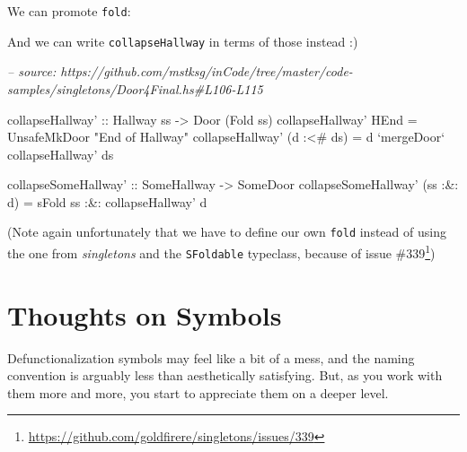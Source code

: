 \documentclass[]{article}
\newenvironment{Shaded}{}{}
\newcommand{\CommentTok}[1]{\textcolor[rgb]{0.38,0.63,0.69}{\textit{#1}}}
\newcommand{\DataTypeTok}[1]{\textcolor[rgb]{0.56,0.13,0.00}{#1}}
\newcommand{\FunctionTok}[1]{\textcolor[rgb]{0.02,0.16,0.49}{#1}}
\newcommand{\NormalTok}[1]{#1}
\newcommand{\OtherTok}[1]{\textcolor[rgb]{0.00,0.44,0.13}{#1}}
\newcommand{\StringTok}[1]{\textcolor[rgb]{0.25,0.44,0.63}{#1}}
\renewcommand{\href}[2]{#2\footnote{\url{#1}}}
\begin{document}
We can promote \texttt{fold}:

\begin{Shaded}
\end{Shaded}

And we can write \texttt{collapseHallway} in terms of those instead :)

\begin{Shaded}
\begin{Highlighting}[]
\CommentTok{-- source: https://github.com/mstksg/inCode/tree/master/code-samples/singletons/Door4Final.hs#L106-L115}

\NormalTok{collapseHallway'}
\OtherTok{    ::} \DataTypeTok{Hallway}\NormalTok{ ss}
    \OtherTok{->} \DataTypeTok{Door}\NormalTok{ (}\DataTypeTok{Fold}\NormalTok{ ss)}
\NormalTok{collapseHallway' }\DataTypeTok{HEnd}       \FunctionTok{=} \DataTypeTok{UnsafeMkDoor} \StringTok{"End of Hallway"}
\NormalTok{collapseHallway' (d }\FunctionTok{:<#}\NormalTok{ ds) }\FunctionTok{=}\NormalTok{ d }\OtherTok{`mergeDoor`}\NormalTok{ collapseHallway' ds}

\OtherTok{collapseSomeHallway' ::} \DataTypeTok{SomeHallway} \OtherTok{->} \DataTypeTok{SomeDoor}
\NormalTok{collapseSomeHallway' (ss }\FunctionTok{:&:}\NormalTok{ d) }\FunctionTok{=}
\NormalTok{        sFold ss}
    \FunctionTok{:&:}\NormalTok{ collapseHallway' d}
\end{Highlighting}
\end{Shaded}

(Note again unfortunately that we have to define our own \texttt{fold} instead
of using the one from \emph{singletons} and the \texttt{SFoldable} typeclass,
because of \href{https://github.com/goldfirere/singletons/issues/339}{issue
\#339})

\hypertarget{thoughts-on-symbols}{%
\section{Thoughts on Symbols}\label{thoughts-on-symbols}}

Defunctionalization symbols may feel like a bit of a mess, and the naming
convention is arguably less than aesthetically satisfying. But, as you work with
them more and more, you start to appreciate them on a deeper level.
\end{document}
